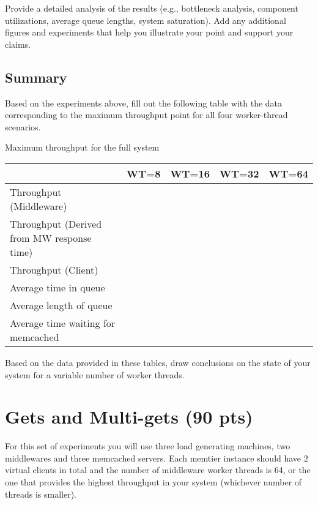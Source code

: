 \documentclass[11pt,a4paper]{article}
\begin{document}
Provide a detailed analysis of the results (e.g., bottleneck analysis, component utilizations, average queue lengths, system saturation). Add any additional figures and experiments that help you illustrate your point and support your claims.

\subsection{Summary}

Based on the experiments above, fill out the following table with the data corresponding to the maximum throughput point for all four worker-thread scenarios.

\begin{center}
	{Maximum throughput for the full system}
	\begin{tabular}{|l|p{1.5cm}|p{1.5cm}|p{1.5cm}|p{1.5cm}|}
		\hline                                            & WT=8 & WT=16 & WT=32 & WT=64 \\ 
		\hline Throughput (Middleware)                    &      &       &       &       \\ 
		\hline Throughput (Derived from MW response time) &      &       &       &       \\ 
		\hline Throughput (Client)                        &      &       &       &       \\ 
		\hline Average time in queue                      &      &       &       &       \\ 
		\hline Average length of queue                    &      &       &       &       \\ 
		\hline Average time waiting for memcached         &      &       &       &       \\ 
		\hline 
	\end{tabular}
\end{center}

Based on the data provided in these tables, draw conclusions on the state of your system for a variable number of worker threads.

\section{Gets and Multi-gets (90 pts)}

For this set of experiments you will use three load generating machines, two middlewares and three memcached servers. Each memtier instance should have 2 virtual clients in total and the number of middleware worker threads is 64, or the one that provides the highest throughput in your system (whichever number of threads is smaller).
\end{document}
